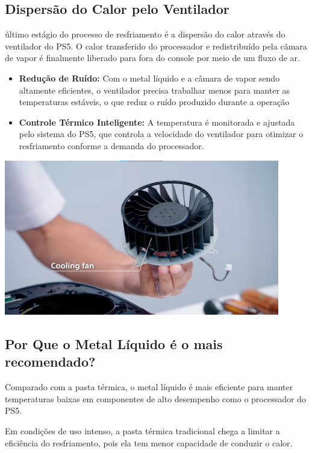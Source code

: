 \documentclass[12pt]{article}
\begin{document}
\subsection{Dispersão do Calor pelo Ventilador}
último estágio do processo de resfriamento é a dispersão do calor através do ventilador do PS5. O calor transferido do processador e redistribuído pela câmara de vapor é finalmente liberado para fora do console por meio de um fluxo de ar.
\begin{itemize}
    \item \textbf{Redução de Ruído: } Com o metal líquido e a câmara de vapor sendo altamente eficientes, o ventilador precisa trabalhar menos para manter as temperaturas estáveis, o que reduz o ruído produzido durante a operação
    \item \textbf{Controle Térmico Inteligente:}  A temperatura é monitorada e ajustada pelo sistema do PS5, que controla a velocidade do ventilador para otimizar o resfriamento conforme a demanda do processador.
\end{itemize}
\begin{adjustbox}{center,caption={Fan utilizada no playstation 5 (Imagem: PlayStation/Reprodução)},nofloat=figure,vspace=\bigskipamount}
    \centering
    \includegraphics[width=12cm]{ventoinha.png}
\end{adjustbox}
\subsection{ Por Que o Metal Líquido é o mais recomendado?}
Comparado com a pasta térmica, o metal líquido é mais eficiente para manter temperaturas baixas em componentes de alto desempenho como o processador do PS5. 

Em condições de uso intenso, a pasta térmica tradicional chega a limitar a eficiência do resfriamento, pois ela tem menor capacidade de conduzir o calor.
\end{document}
